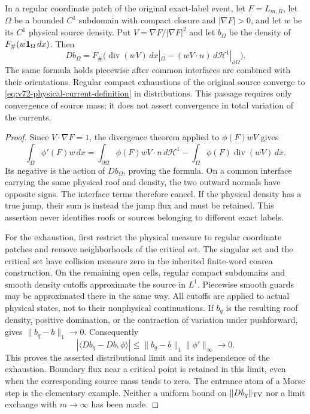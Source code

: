 \begin{proposition}
\label{prop:v72-coarea-flux}
In a regular coordinate patch of the original exact-label event,
let $F=L_{m,R}$, let $\Omega$ be a bounded $C^1$ subdomain with
compact closure and $|\nabla F|>0$, and let $w$ be its $C^1$
physical source density. Put $V=\nabla F/|\nabla F|^2$ and let
$b_\Omega$ be the density of $F_\#(w\mathbf1_\Omega\,dx)$. Then
\begin{equation}\label{eq:v72-coarea-flux}
 Db_\Omega=F_\#\bigl(\operatorname{div}(wV)\,dx|_\Omega
                   -(wV\cdot n)\,d\mathcal H^1|_{\partial\Omega}\bigr).
\end{equation}
The same formula holds piecewise after common interfaces are combined
with their orientations. Regular compact exhaustions of the original
source converge to \eqref{eq:v72-physical-current-definition} in
distributions. This passage requires only convergence of source mass;
it does not assert convergence in total variation of the currents.
\end{proposition}
\begin{proof}
Since $V\cdot\nabla F=1$, the divergence theorem applied to
$\phi(F)wV$ gives
\[
 \int_\Omega\phi'(F)w\,dx
 =\int_{\partial\Omega}\phi(F)wV\cdot n\,d\mathcal H^1
                  -\int_\Omega\phi(F)\operatorname{div}(wV)\,dx.
\]
Its negative is the action of $Db_\Omega$, proving the formula.
On a common interface carrying the same physical roof and density,
the two outward normals have opposite signs. The interface terms
therefore cancel. If the physical density has a true jump, their sum
is instead the jump flux and must be retained. This assertion never
identifies roofs or sources belonging to different exact labels.

For the exhaustion, first restrict the physical measure to regular
coordinate patches and remove neighborhoods of the critical set.
The singular set and the critical set have collision measure zero
in the inherited finite-word coarea construction. On the remaining
open cells, regular compact subdomains and smooth density cutoffs
approximate the source in $L^1$. Piecewise smooth guards may be
approximated there in the same way. All cutoffs are applied to actual
physical states, not to their nonphysical continuations. If $b_q$
is the resulting roof density, positive domination, or the contraction
of variation under pushforward, gives $\|b_q-b\|_1\to0$.
Consequently
\[
 |\langle Db_q-Db,\phi\rangle|
                  \le\|b_q-b\|_1\|\phi'\|_\infty\longrightarrow0.
\]
This proves the asserted distributional limit and its independence
of the exhaustion. Boundary flux near a critical point is retained
in this limit, even when the corresponding source mass tends to zero.
The entrance atom of a Morse step is the elementary example. Neither
a uniform bound on $\|Db_q\|_{\operatorname{TV}}$ nor a limit exchange with
$m\to\infty$ has been made.
\end{proof}

